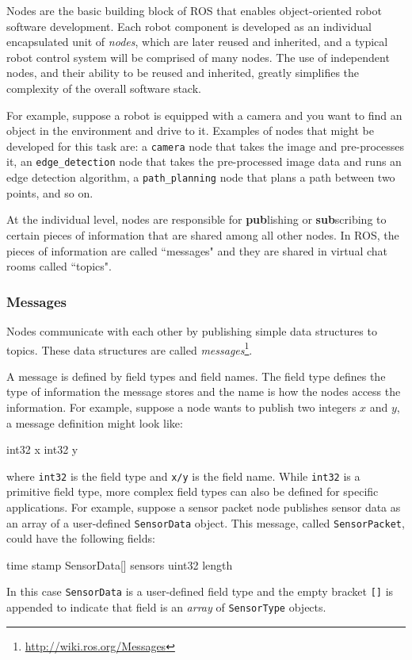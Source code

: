 Nodes are the basic building block of ROS that enables object-oriented robot software development. Each robot component is developed as an individual encapsulated unit of \textit{nodes}, which are later reused and inherited, and a typical robot control system will be comprised of many nodes. The use of independent nodes, and their ability to be reused and inherited, greatly simplifies the complexity of the overall software stack.

For example, suppose a robot is equipped with a camera and you want to find an object in the environment and drive to it. Examples of nodes that might be developed for this task are: a \texttt{camera} node that takes the image and pre-processes it, an \texttt{edge\_detection} node that takes the pre-processed image data and runs an edge detection algorithm, a \texttt{path\_planning} node that plans a path between two points, and so on.

At the individual level, nodes are responsible for \textbf{pub}lishing or \textbf{sub}scribing to certain pieces of information that are shared among all other nodes. In ROS, the pieces of information are called ``messages" and they are shared in virtual chat rooms called ``topics".

\subsubsection{Messages}

\begin{definition}[Messages]
Nodes communicate with each other by publishing simple data structures to topics. These data structures are called \textit{messages}\footnote{\url{http://wiki.ros.org/Messages}}.

\end{definition}
A message is defined by field types and field names. The field type defines the type of information the message stores and the name is how the nodes access the information. For example, suppose a node wants to publish two integers $x$ and $y$, a message definition might look like:
\begin{gencode}
int32 x
int32 y
\end{gencode}
where \texttt{int32} is the field type and \texttt{x/y} is the field name. While \texttt{int32} is a primitive field type, more complex field types can also be defined for specific applications. For example, suppose a sensor packet node publishes sensor data as an array of a user-defined \texttt{SensorData} object. This message, called \texttt{SensorPacket}, could have the following fields: 
\begin{gencode}
time            stamp
SensorData[]    sensors
uint32          length
\end{gencode}
In this case \texttt{SensorData} is a user-defined field type and the empty bracket \texttt{[]} is appended to indicate that field is an \textit{array} of \texttt{SensorType} objects.

